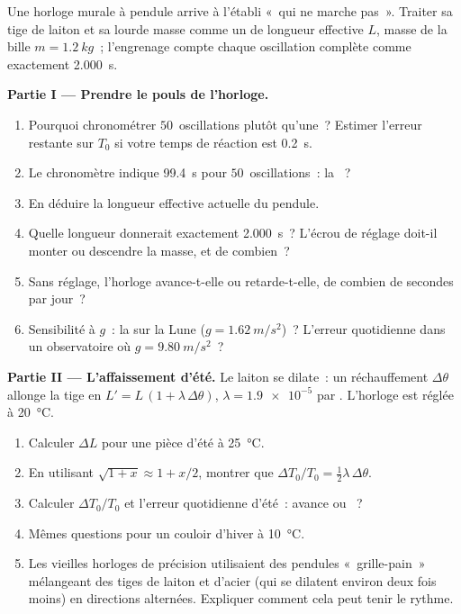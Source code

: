 \begin{problem}
\label{pb:g12:oscillators-and-time:1}
Une horloge murale à pendule arrive à l'établi «~qui ne marche pas~».
Traiter sa tige de laiton et sa lourde masse comme un
 de longueur effective $L$, masse de
la bille $m = \qty{1.2}{kg}$~; l'engrenage compte chaque oscillation
complète comme exactement \qty{2.000}{s}.

\medskip
\noindent\textbf{Partie I --- Prendre le pouls de l'horloge.}
\begin{enumerate}
  \item Pourquoi chronométrer $50$~oscillations plutôt qu'une~?
        Estimer l'erreur restante sur $T_0$ si votre temps de réaction
        est \qty{0.2}{s}.
  \item Le chronomètre indique \qty{99.4}{s} pour $50$~oscillations~:
        la ~?
  \item En déduire la longueur effective actuelle du pendule.
  \item Quelle longueur donnerait exactement \qty{2.000}{s}~? L'écrou
        de réglage doit-il monter ou descendre la masse, et de
        combien~?
  \item Sans réglage, l'horloge avance-t-elle ou retarde-t-elle, de
        combien de secondes par jour~?
  \item Sensibilité à $g$~: la  sur la Lune
        ($g = \qty{1.62}{m/s^2}$)~? L'erreur quotidienne dans un
        observatoire où $g = \qty{9.80}{m/s^2}$~?
\end{enumerate}

\medskip
\noindent\textbf{Partie II --- L'affaissement d'été.} Le laiton se
dilate~: un réchauffement $\Delta\theta$ allonge la tige en
$L' = L\,(1 + \lambda\, \Delta\theta)$, $\lambda = \num{1.9e-5}$ par
. L'horloge est réglée à \qty{20}{\celsius}.
\begin{enumerate}[resume]
  \item Calculer $\Delta L$ pour une pièce d'été à \qty{25}{\celsius}.
  \item En utilisant $\sqrt{1+x} \approx 1 + x/2$, montrer que
        $\Delta T_0 / T_0 = \tfrac12 \lambda\, \Delta\theta$.
  \item Calculer $\Delta T_0/T_0$ et l'erreur quotidienne d'été~:
        avance ou ~?
  \item Mêmes questions pour un couloir d'hiver à \qty{10}{\celsius}.
  \item Les vieilles horloges de précision utilisaient des pendules
        «~grille-pain~» mélangeant des tiges de laiton et d'acier
        (qui se dilatent environ deux fois moins) en directions
        alternées. Expliquer comment cela peut tenir le rythme.
\end{enumerate}


\end{problem}
